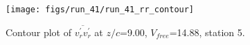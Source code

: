 \begin{figure}[H]
\centering
\texttt{[image: figs/run\_41/run\_41\_rr\_contour]}
\caption{Contour plot of $\overline{v_{r}^{\prime} v_{r}^{\prime}}$ at $z/c$=9.00, $V_{free}$=14.88, station 5.}
\label{fig:run_41_rr_contour}
\end{figure}


